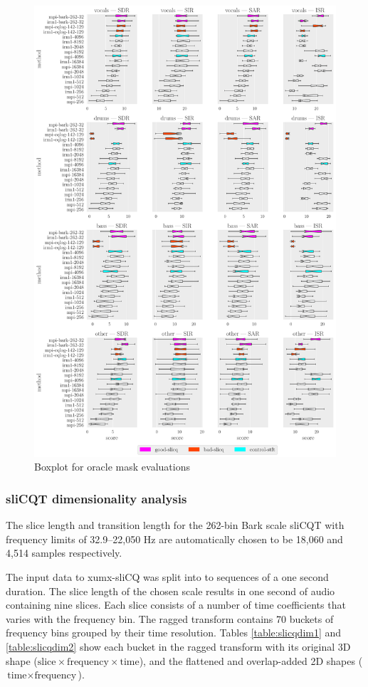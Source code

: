 \documentclass[report.tex]{subfiles}
\begin{document}
\begin{figure}[ht]
	\centering
	\includegraphics[width=\textwidth]{./images-bss/oracle_boxplot.pdf}
	\caption{Boxplot for oracle mask evaluations}
	\label{fig:oraclebssboxplot}
\end{figure}

\subsubsection{sliCQT dimensionality analysis}

The slice length and transition length for the 262-bin Bark scale sliCQT with frequency limits of 32.9--22,050 Hz are automatically chosen to be 18,060 and 4,514 samples respectively.

The input data to xumx-sliCQ was split into to sequences of a one second duration. The slice length of the chosen scale results in one second of audio containing nine slices. Each slice consists of a number of time coefficients that varies with the frequency bin. The ragged transform contains 70 buckets of frequency bins grouped by their time resolution. Tables \ref{table:slicqdim1} and \ref{table:slicqdim2} show each bucket in the ragged transform with its original 3D shape ($\text{slice} \times \text{frequency} \times \text{time}$), and the flattened and overlap-added 2D shapes ($\text{time} \times \text{frequency}$).
\end{document}
